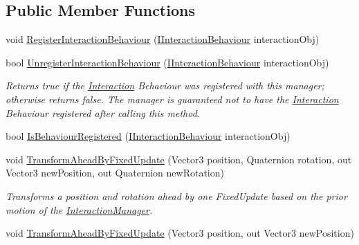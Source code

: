 \subsection*{Public Member Functions}
\begin{DoxyCompactItemize}
\item 
void \mbox{\hyperlink{class_leap_1_1_unity_1_1_interaction_1_1_interaction_manager_acc03ba640a74c7b100a7942c427b9ad9}{Register\+Interaction\+Behaviour}} (\mbox{\hyperlink{interface_leap_1_1_unity_1_1_interaction_1_1_i_interaction_behaviour}{I\+Interaction\+Behaviour}} interaction\+Obj)
\item 
bool \mbox{\hyperlink{class_leap_1_1_unity_1_1_interaction_1_1_interaction_manager_a789f594e57a18f29111f81ada09cd262}{Unregister\+Interaction\+Behaviour}} (\mbox{\hyperlink{interface_leap_1_1_unity_1_1_interaction_1_1_i_interaction_behaviour}{I\+Interaction\+Behaviour}} interaction\+Obj)
\begin{DoxyCompactList}\small\item\em Returns true if the \mbox{\hyperlink{namespace_leap_1_1_unity_1_1_interaction}{Interaction}} Behaviour was registered with this manager; otherwise returns false. The manager is guaranteed not to have the \mbox{\hyperlink{namespace_leap_1_1_unity_1_1_interaction}{Interaction}} Behaviour registered after calling this method. \end{DoxyCompactList}\item 
bool \mbox{\hyperlink{class_leap_1_1_unity_1_1_interaction_1_1_interaction_manager_a98a566e73eea4c336c32fad4a89f8502}{Is\+Behaviour\+Registered}} (\mbox{\hyperlink{interface_leap_1_1_unity_1_1_interaction_1_1_i_interaction_behaviour}{I\+Interaction\+Behaviour}} interaction\+Obj)
\item 
void \mbox{\hyperlink{class_leap_1_1_unity_1_1_interaction_1_1_interaction_manager_ab3f0e103a262ec1e7a9689e243cb62ad}{Transform\+Ahead\+By\+Fixed\+Update}} (Vector3 position, Quaternion rotation, out Vector3 new\+Position, out Quaternion new\+Rotation)
\begin{DoxyCompactList}\small\item\em Transforms a position and rotation ahead by one Fixed\+Update based on the prior motion of the \mbox{\hyperlink{class_leap_1_1_unity_1_1_interaction_1_1_interaction_manager}{Interaction\+Manager}}. \end{DoxyCompactList}\item 
void \mbox{\hyperlink{class_leap_1_1_unity_1_1_interaction_1_1_interaction_manager_a930a2c30dd330b50d86b1ead4eda9a0a}{Transform\+Ahead\+By\+Fixed\+Update}} (Vector3 position, out Vector3 new\+Position)

\end{DoxyCompactItemize}

